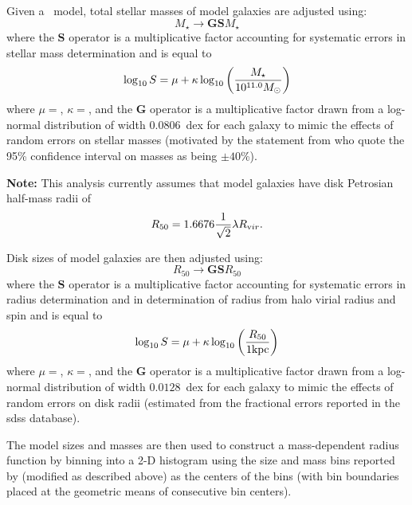Given a \glc\ model, total stellar masses of model galaxies are adjusted using:
\begin{equation}
 M_\star \rightarrow {\mathbf G} {\mathbf S} M_\star 
\end{equation}
where the ${\mathbf S}$ operator is a multiplicative factor accounting for systematic errors in stellar mass determination and is equal to \citep{behroozi_comprehensive_2010}
\begin{equation}
 \log_{\mathrm 10} S = \mu + \kappa \log_{\mathrm 10} \left({M_\star \over 10^{11.0}M_\odot}\right)
\end{equation}
where $\mu=${\normalfont {}}, $\kappa=${\normalfont {}}, and the {\normalfont \bfseries G} operator is a multiplicative factor drawn from a log-normal distribution of width $0.0806$~dex for each galaxy to mimic the effects of random errors on stellar masses (motivated by the statement from \cite{shen_size_2003} who quote the 95\% confidence
interval on masses as being $\pm 40$\%).

{\normalfont \bfseries Note:} This analysis currently assumes that model galaxies have disk Petrosian half-mass radii of
\begin{equation}
 R_{\mathrm 50} = 1.6676 {1 \over \sqrt{2}} \lambda R_{\mathrm vir}.
\end{equation}

Disk sizes of model galaxies are then adjusted using:
\begin{equation}
 R_{50} \rightarrow {\mathbf G} {\mathbf S} R_{50} 
\end{equation}
where the ${\mathbf S}$ operator is a multiplicative factor accounting for systematic errors in radius determination and in determination of radius from halo virial radius and spin and is equal to
\begin{equation}
 \log_{\mathrm 10} S = \mu + \kappa \log_{\mathrm 10} \left({R_{50} \over 1 \hbox{kpc}}\right)
\end{equation}
where $\mu=${\normalfont {}}, $\kappa=${\normalfont {}}, and the {\normalfont \bfseries G} operator is a multiplicative factor drawn from a log-normal distribution of width $0.0128$~dex for each galaxy to mimic the effects of random errors on disk radii (estimated from the fractional errors reported in the \gls{sdss} database).

The model sizes and masses are then used to construct a mass-dependent radius function by binning into a 2-D histogram using the size and mass bins reported by \cite{shen_size_2003} (modified as described above) as the centers of the bins (with bin boundaries placed at the geometric means of consecutive bin centers).

